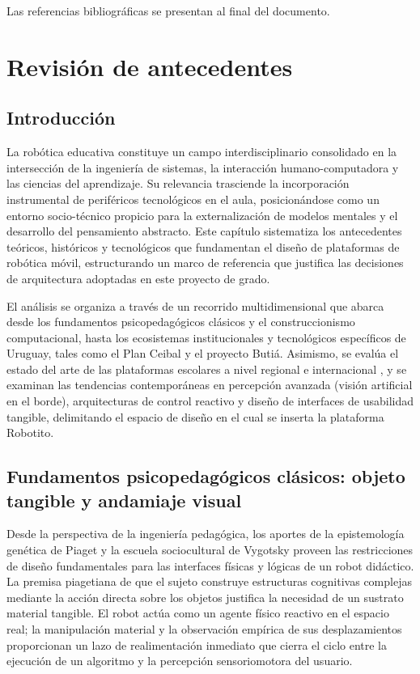\documentclass{prgrado}
\begin{document}
Las referencias bibliográficas se presentan al final del documento.


\chapter{Revisión de antecedentes}

\section{Introducción}

La robótica educativa constituye un campo interdisciplinario consolidado en la intersección de la ingeniería de sistemas, la interacción humano-computadora y las ciencias del aprendizaje. Su relevancia trasciende la incorporación instrumental de periféricos tecnológicos en el aula, posicionándose como un entorno socio-técnico propicio para la externalización de modelos mentales y el desarrollo del pensamiento abstracto. Este capítulo sistematiza los antecedentes teóricos, históricos y tecnológicos que fundamentan el diseño de plataformas de robótica móvil, estructurando un marco de referencia que justifica las decisiones de arquitectura adoptadas en este proyecto de grado.

El análisis se organiza a través de un recorrido multidimensional que abarca desde los fundamentos psicopedagógicos clásicos y el construccionismo computacional, hasta los ecosistemas institucionales y tecnológicos específicos de Uruguay, tales como el Plan Ceibal y el proyecto Butiá. Asimismo, se evalúa el estado del arte de las plataformas escolares a nivel regional e internacional \cite{orlando2015robotica,pinto2010uso,quiroga2017preescolar,ferrada2021robotica,garcia2020robotica,kynigos2018stem}, y se examinan las tendencias contemporáneas en percepción avanzada (visión artificial en el borde), arquitecturas de control reactivo y diseño de interfaces de usabilidad tangible, delimitando el espacio de diseño en el cual se inserta la plataforma Robotito.

\section{Fundamentos psicopedagógicos clásicos: objeto tangible y andamiaje visual}

Desde la perspectiva de la ingeniería pedagógica, los aportes de la epistemología genética de Piaget \cite{mcleod2025piaget} y la escuela sociocultural de Vygotsky proveen las restricciones de diseño fundamentales para las interfaces físicas y lógicas de un robot didáctico. La premisa piagetiana de que el sujeto construye estructuras cognitivas complejas mediante la acción directa sobre los objetos justifica la necesidad de un sustrato material tangible. El robot actúa como un agente físico reactivo en el espacio real; la manipulación material y la observación empírica de sus desplazamientos proporcionan un lazo de realimentación inmediato que cierra el ciclo entre la ejecución de un algoritmo y la percepción sensoriomotora del usuario.
\end{document}
